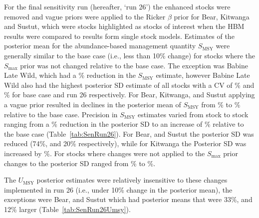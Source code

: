 \documentclass[french,11pt]{book}
\begin{document}
For the final sensitivity run (hereafter, `run 26') the enhanced stocks were removed and vague priors were applied to the Ricker \(\beta\) prior for Bear, Kitwanga and Sustut, which were stocks highlighted as stocks of interest when the HBM results were compared to results form single stock models. Estimates of the posterior mean for the abundance-based management quantity $S_\textrm{MSY}$ were generally similar to the base case (i.e., less than 10\% change) for stocks where the $S_\textrm{max}$ prior was not changed relative to the base case. The exception was Babine Late Wild, which had a \% reduction in the $S_\textrm{MSY}$ estimate, however Babine Late Wild also had the highest posterior SD estimate of all stocks with a CV of \% and \% for base case and run 26 respectively. For Bear, Kitwanga, and Sustut applying a vague prior resulted in declines in the posterior mean of $S_\textrm{MSY}$ from \% to \% relative to the base case. Precision in $S_\textrm{MSY}$ estimates varied from stock to stock ranging from a \% reduction in the posterior SD to an increase of \% relative to the base case (Table~\ref{tab:SenRun26}). For Bear, and Sustut the posterior SD was reduced (74\%, and 20\% respectively), while for Kitwanga the Posterior SD was increased by \%. For stocks where changes were not applied to the $S_\textrm{max}$ prior changes to the posterior SD ranged from \% to \%.

The $U_\textrm{MSY}$ posterior estimates were relatively insensitive to these changes implemented in run 26 (i.e., under 10\% change in the posterior mean), the exceptions were Bear, and Sustut which had posterior means that were 33\%, and 12\% larger (Table~\ref{tab:SenRun26Umsy}).
\end{document}
